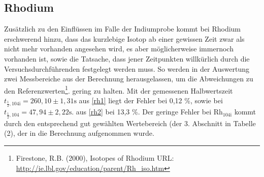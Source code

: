 \subsection{Rhodium}
Zusätzlich zu den Einflüssen im Falle der Indiumprobe kommt bei Rhodium erschwerend hinzu, dass das kurzlebige Isotop ab einer gewissen
Zeit zwar als nicht mehr vorhanden angesehen wird, es aber möglicherweise immernoch vorhanden ist, sowie die Tatsache, dass jener Zeitpunkten
willkürlich durch die Versuchsdurchführenden festgelegt werden muss. So werden in der Auswertung zwei Messbereiche aus der Berechnung
herausgelassen, um die Abweichungen zu den Referenzwerten\footnote[2]{Firestone, R.B. (2000), Isotopes of Rhodium URL: \href{http://ie.lbl.gov/education/parent/Rh\_iso.htm}{http://ie.lbl.gov/education/parent/Rh\_iso.htm}}. gering zu halten. Mit der gemessenen Halbwertszeit $t_{\frac12,\text{104i}} = 260,10 \pm 1,31 \text{s}$ aus \eqref{rh1}
liegt der Fehler bei 0,12 \%, sowie bei $t_{\frac12,\text{104}} = 47,94 \pm 2,22 \text{s}.$ aus \eqref{rh2} bei 13,3 \%. Der geringe Fehler
bei Rh$_{104\text{i}}$ kommt durch den entsprechend gut gewählten Wertebereich (der 3. Abschnitt in Tabelle (2), der 
in die Berechnung aufgenommen wurde.





